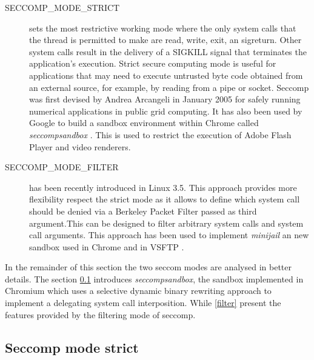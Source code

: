 \begin{description}
\item[SECCOMP\_MODE\_STRICT] sets the most restrictive working mode where the only system calls that the thread is permitted to make are read, write, exit, an 
						sigreturn.  Other system calls result in the delivery of a SIGKILL signal that terminates the application's execution. Strict secure computing mode is
						useful for applications that may need to execute untrusted byte code obtained from an external source, for example, by	reading from a pipe or socket.
						Seccomp was first devised by Andrea Arcangeli in January 2005 for safely running numerical applications in public grid computing. It has also been
						used by Google to build a sandbox environment within Chrome called \textit{seccompsandbox} \cite{seccompsandbox}. This is used to restrict the execution
						of Adobe Flash Player and video renderers.
						
\item[SECCOMP\_MODE\_FILTER] has been recently introduced in Linux 3.5. This approach provides more flexibility respect the strict mode as it allows to define which system call
						should be denied via a Berkeley Packet Filter \cite{bpf} passed as third argument.This can be designed to filter arbitrary system calls and system call
						arguments. This approach has been used to implement \textit{minijail}  \cite{minijail} an new sandbox used in Chrome and in VSFTP \cite{vsftp}. 

\end{description}

In the remainder of this section the two seccom modes are analysed in better details. The  section \ref{seccompsandbox} introduces \textit{seccompsandbox}, the sandbox implemented in Chromium which uses a selective dynamic binary rewriting approach to implement a delegating system call interposition. While \ref{filter} present the features provided by the filtering mode of seccomp. 

\subsection{Seccomp mode strict}
\label{seccompsandbox}


